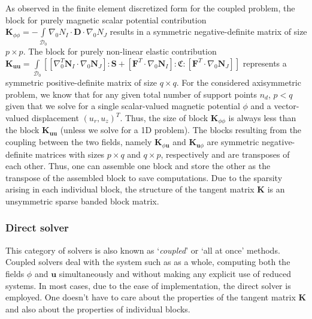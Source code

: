 \documentclass[11pt,a4paper,final]{article}
\begin{document}
As observed in the finite element discretized form for the coupled problem, the block for purely magnetic scalar potential contribution $\mathbf{K}_{\phi \phi} = - \int\limits_{\mathcal{D}_0} \nabla_0 N_I \cdot \mathbf{D} \cdot \nabla_0 N_J$ results in a symmetric negative-definite matrix of size $p \times p$. The block for purely non-linear elastic contribution $\mathbf{K}_{\mathbf{u} \mathbf{u}} = \int\limits_{\mathcal{D}_0} \left[ \left[ \nabla_0^T \mathbf{N}_I \cdot \nabla_0 \mathbf{N}_J \right] : \mathbf{S} + \left[ \mathbf{F}^T \cdot \nabla_0 \mathbf{N}_I \right] : \mathfrak{C} : \left[ \mathbf{F}^T \cdot \nabla_0 \mathbf{N}_J \right] \right]$ represents a symmetric positive-definite matrix of size $q \times q$. For the considered axisymmetric problem, we know that for any given total number of support points $n_d$, $p < q$ given that we solve for a single scalar-valued magnetic potential $\phi$ and a vector-valued displacement $(u_r, u_z)^T$. Thus, the size of block $\mathbf{K}_{\phi \phi}$ is always less than the block $\mathbf{K}_{\mathbf{u} \mathbf{u}}$ (unless we solve for a 1D problem). The blocks resulting from the coupling between the two fields, namely $\mathbf{K}_{\phi \mathbf{u}}$ and $\mathbf{K}_{\mathbf{u} \phi}$ are symmetric negative-definite matrices with sizes $p \times q$ and $q \times p$, respectively and are transposes of each other. Thus, one can assemble one block and store the other as the transpose of the assembled block to save computations. Due to the sparsity arising in each individual block, the structure of the tangent matrix $\mathbf{K}$ is an unsymmetric sparse banded block matrix.\par 

\subsubsection{Direct solver}
This category of solvers is also known as `\textit{coupled}' or `all at once' methods. Coupled solvers deal with the system such as  as a whole, computing both the fields $\phi$ and $\mathbf{u}$ simultaneously and without making any explicit use of reduced systems. In most cases, due to the ease of implementation, the direct solver is employed. One doesn't have to care about the properties of the tangent matrix $\mathbf{K}$ and also about the properties of individual blocks. \par 
\end{document}
